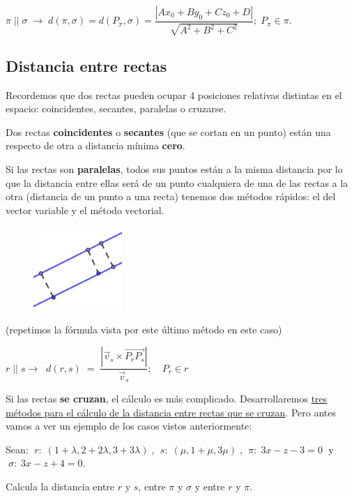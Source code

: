 \noindent $\pi\;||\;\sigma \;\to \; d(\pi,\sigma)=d(P_\pi,\sigma)=\dfrac {|Ax_0+By_0+Cz_0+D|}{\sqrt{A^2+B^2+C^2}};\;P_{\pi}\in \pi$.



\subsection{Distancia entre rectas}

Recordemos que dos rectas pueden ocupar 4 posiciones relativas distintas en el espacio: coincidentes, secantes, paralelas o cruzarse.

Dos rectas \textbf{coincidentes} o \textbf{secantes} (que se cortan en un punto) están una respecto de otra a distancia mínima \textbf{cero}.

\begin{multicols}{2}
\small{Si las rectas son \textbf{paralelas}, todos sus puntos están a la misma distancia por lo que la distancia entre ellas será de un punto cualquiera de una de las rectas a la otra (distancia de un punto a una recta) tenemos dos métodos rápidos: el del vector variable y el método vectorial}\normalsize{.}
\begin{figure}[H]
		\centering
		\includegraphics[width=0.3\textwidth]{imagenes/imagenes11/T11IM15.png}
	\end{figure}
\end{multicols}
(repetimos la fórmula vista por este último método en este caso)

$r\;||\;s\to \;\; d(r,s)\;=\;\dfrac {|\vec v_s \times \overrightarrow{P_rP_s} |}{\vec v_s}; \quad P_r\in r$

Si las rectas \textbf{se cruzan}, el cálculo es más complicado. Desarrollaremos \underline{tres métodos para el cálculo de la distancia entre rectas que se cruzan}. Pero antes vamos a ver un ejemplo de los casos vistos anteriormente:

\begin{ejem} Sean: $\;r:\; (1+\lambda,2+2\lambda, 3+3\lambda)\;$,
$\;s:\;(\mu, 1+\mu, 3\mu)\;$, 
$\;\pi:\; 3x-z-3=0\;$ y
 $\;\sigma:\; 3x-z+4=0$. 

Calcula la distancia entre $r$ y $s$, entre $\pi$ y $\sigma$ y entre $r$ y $\pi$.
	
\end{ejem}

